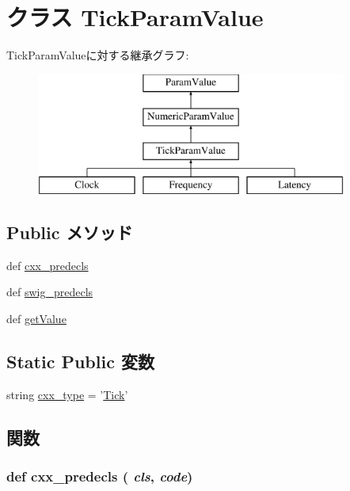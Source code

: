 \hypertarget{classm5_1_1params_1_1TickParamValue}{
\section{クラス TickParamValue}
\label{classm5_1_1params_1_1TickParamValue}
}
TickParamValueに対する継承グラフ:\begin{figure}[H]
\begin{center}
\leavevmode
\includegraphics[height=4cm]{classm5_1_1params_1_1TickParamValue}
\end{center}
\end{figure}
\subsection*{Public メソッド}
\begin{DoxyCompactItemize}
\item 
def \hyperlink{classm5_1_1params_1_1TickParamValue_a0b408a11a14bd1d770e28f71a6e14ab5}{cxx\_\-predecls}
\item 
def \hyperlink{classm5_1_1params_1_1TickParamValue_ab3dbcf5716623eac67a8ccc074fa7e13}{swig\_\-predecls}
\item 
def \hyperlink{classm5_1_1params_1_1TickParamValue_acc340fbd4335fa34f9d57fb454b28ed0}{getValue}
\end{DoxyCompactItemize}
\subsection*{Static Public 変数}
\begin{DoxyCompactItemize}
\item 
string \hyperlink{classm5_1_1params_1_1TickParamValue_a2f1553ebb79374a68b36fdd6d8d82fc3}{cxx\_\-type} = '\hyperlink{classm5_1_1params_1_1Tick}{Tick}'
\end{DoxyCompactItemize}


\subsection{関数}
\hypertarget{classm5_1_1params_1_1TickParamValue_a0b408a11a14bd1d770e28f71a6e14ab5}{
\subsubsection[{cxx\_\-predecls}]{\setlength{\rightskip}{0pt plus 5cm}def cxx\_\-predecls ( {\em cls}, \/   {\em code})}}
\label{classm5_1_1params_1_1TickParamValue_a0b408a11a14bd1d770e28f71a6e14ab5}


